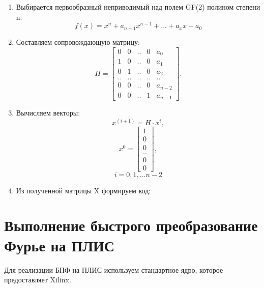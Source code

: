 \begin{enumerate}
    \item Выбирается первообразный неприводимый над полем GF(2) полином степени n:
    \begin{equation}
    f(x) = x^{n} + a_{n-1}x^{n-1} + ... + a_{x}x + a_{0}
    \end{equation}
    \item Составляем сопровождающую матрицу:
    \begin{equation} 
    H = 
        \begin{bmatrix}
            0 & 0 & .. & 0 & a_{0}\\
            1 & 0 & .. & 0 & a_{1}\\
            0 & 1 & .. & 0 & a_{2}\\
            .. & .. & .. & .. & ..\\
            0 & 0 & .. & 0 & a_{n-2}\\
            0 & 0 & .. & 1 & a_{n-1}
        \end{bmatrix}.
    \end{equation}
    \item Вычисляем векторы:
    \begin{equation}
        x^{(i + 1)} = H \cdot x^{i}, 
    \end{equation}
    \begin{equation}
        x^{0} =
        \begin{bmatrix}
            1 \\
            0 \\
            0 \\
            ..\\
            0 \\
            0 
        \end{bmatrix}, 
    \end{equation}
    \begin{equation}
        i = 0, 1, ... n - 2
    \end{equation}
    \item Из полученной матрицы X формируем код:
\end{enumerate}

\section{Выполнение быстрого преобразование Фурье на ПЛИС}

Для реализации БПФ на ПЛИС используем стандартное ядро, которое предоставляет Xilinx.

